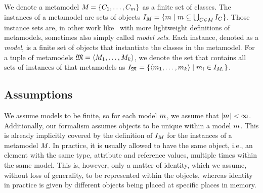 We denote a metamodel $M_{} = \{ C_{1}, \dots, C_{m} \}$ as a finite set of classes.
The instances of a metamodel are sets of objects $I_{M_{}} = \{ m_{} \mid m_{} \subseteq \bigcup_{C_{} \in M_{}} I_{C_{}} \}$.
Those instance sets are, in other work like~\cite{stevens2020BidirectionalTransformationLarge-SoSym} with more lightweight definitions of metamodels, sometimes also simply called \emph{model sets}.
Each instance, denoted as a \emph{model}, is a finite set of objects that instantiate the classes in the metamodel.
For a tuple of metamodels $\mathfrak{M} = \langle M_{1}, \dots, M_{k} \rangle$, we denote the set that contains all sets of instances of that metamodels as $I_{\mathfrak{M}} = \{  \langle m_{1}, \dots, m_{k} \rangle \mid m_{i} \in I_{M_{i}} \}$.



\subsection{Assumptions}
\label{chap:networks:assumption}

We assume models to be finite, so for each model $m_{}$, we assume that $|m_{}| < \infty$.
Additionally, our formalism assumes objects to be unique within a model $m_{}$. 
This is already implicitly covered by the definition of $I_{M_{}}$ for the instances of a metamodel $M_{}$. 
In practice, it is usually allowed to have the same object, i.e., an element with the same type, attribute and reference values, multiple times within the same model. 
This is, however, only a matter of identity, which we assume, without loss of generality, to be represented within the objects, whereas identity in practice is given by different objects being placed at specific places in memory.





